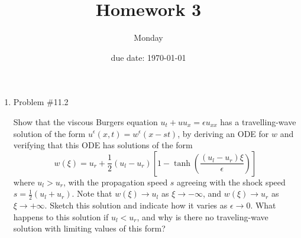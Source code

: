 \documentclass[11pt]{article}
\begin{document}
\title{\Large\bf Homework 3}
\author{Monday}
\date{due date: \today}
\maketitle
\thispagestyle{fancy}
\renewcommand{\qed}{\hfill \mbox{\raggedright \rule{0.07in}{0.1in}}} %

\begin{enumerate}
    \item Problem \#11.2
            
			Show that the viscous Burgers equation $u_t+uu_x=\epsilon u_{xx}$ has a travelling-wave solution of the form $u^{\epsilon}(x,t)=w^{\epsilon}(x-st)$, by deriving an ODE for $w$ and verifying that this ODE has solutions of the form
			\[
			w(\xi)=u_r+\frac{1}{2}(u_l-u_r)[1-\tanh(\frac{(u_l-u_r)\xi}{\epsilon})]
			\]
			where $u_l>u_r$, with the propagation speed $s$ agreeing with the shock speed $s=\frac{1}{2}(u_l+u_r)$. Note that $w(\xi)\rightarrow u_l$ as $\xi\rightarrow -\infty$, and $w(\xi)\rightarrow u_r$ as $\xi \rightarrow +\infty$. Sketch this solution and indicate how it varies as $\epsilon \rightarrow 0$. What happens to this solution if $u_l<u_r$, and why is there no traveling-wave solution with limiting values of this form?
		
		\vskip 5pt
        \vskip 5pt
        

\end{enumerate}
\end{document}
